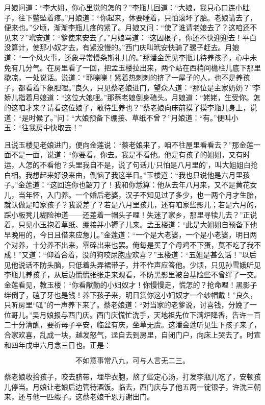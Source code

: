 月娘问道：“李大姐，你心里觉的怎的？”李瓶儿回道：“大娘，我只心口连小肚子，往下鳖坠着疼。”月娘道：“你起来，休要睡着，只怕滚坏了胎。老娘请去了，便来也。”少顷，渐渐李瓶儿疼的紧了。月娘又问：“使了谁请老娘去了？这咱还不见来？”玳安道：“爹使来安去了。”月娘骂道：“这囚根子，你还不快迎迎去！平白没算计，使那小奴才去，有紧没慢的。”西门庆叫玳安快骑了骡子赶去。月娘道：“一个风火事，还象寻常慢条斯礼儿的。”那潘金莲见李瓶儿待养孩子，心中未免有几分气。在房里看了一回，把孟玉楼拉出来，两个站在西梢间檐柱儿底下那里歇凉，一处说话。说道：“耶嚛嚛！紧着热剌剌的挤了一屋子的人，也不是养孩子，都看着下象胆哩。”良久，只见蔡老娘进门，望众人道：“那位是主家奶奶？”李娇儿指着月娘道：“这位大娘哩。”那蔡老娘倒身磕头。月娘道：“姥姥，生受你。怎的这咱才来？请看这位娘子，敢待生养也？”蔡老娘向床前摸了摸李瓶儿身上，说道：“是时候了。”问：“大娘预备下绷接、草纸不曾？”月娘道：“有。”便叫小玉：“往我房中快取去！”

且说玉楼见老娘进门，便向金莲说：“蔡老娘来了，咱不往屋里看看去？”那金莲一面不是一面，说道：“你要看，你去。我是不看他。他是有孩子的姐姐，又有时运，人怎的不看他？头里我自不是，说了句话儿‘只怕是八月里的’，叫大姐姐白抢白相。我想起来好没来由，倒恼了我这半日。”玉楼道：“我也只说他是六月里孩子。”金莲道：“这回连你也韶刀了！我和你恁算：他从去年八月来，又不是黄花女儿，当年怀，入门养。一个婚后老婆，汉子不知见过了多少，也一两个月才生胎，就认做是咱家孩子？我说差了？若是八月里孩儿，还有咱家些影儿；若是六月的，踩小板凳儿糊险神道——还差着一帽头子哩！失迷了家乡，那里寻犊儿去？”正说着，只见小玉抱着草纸、绷接并小褥子儿来。孟玉楼道：“此是大姐姐自预备下他早晚用的，今日且借来应急儿。”金莲道：“一个是大老婆，一个是小老婆，明日两个对养，十分养不出来，零碎出来也罢。俺每是买了个母鸡不下蛋，莫不吃了我不成！”又道：“仰着合着，没的狗咬尿胞虚欢喜？”玉楼道：“五姐是甚么话！”以后见他说话不防头脑，只低着头弄裙带子，并不作声应答他。少顷，只见孙雪娥听见李瓶儿养孩子，从后边慌慌张张走来观看，不防黑影里被台基险些不曾绊了一交。金莲看见，教玉楼：“你看献勤的小妇奴才！你慢慢走，慌怎的？抢命哩！黑影子绊倒了，磕了牙也是钱！养下孩子来，明日赏你这小妇奴才一个纱帽戴！”良久，只听房里“呱”的一声养下来了。蔡老娘道：“对当家的老爹说，讨喜钱，分娩了一位哥儿。”吴月娘报与西门庆。西门庆慌忙洗手，天地祖先位下满炉降香，告许一百二十分清醮，要祈母子平安，临盆有庆，坐草无虞。这潘金莲听见生下孩子来了，合家欢喜，乱成一块，越发怒气，迳自去到房里，自闭门户，向床上哭去了。时宣和四年戊申六月念三日也。正是：

\[
不如意事常八九，可与人言无二三。
\]

蔡老娘收拾孩子，咬去脐带，埋毕衣胞，熬了些定心汤，打发李瓶儿吃了，安顿孩儿停当。月娘让老娘后边管待酒饭。临去，西门庆与了他五两一锭银子，许洗三朝来，还与他一匹缎子。这蔡老娘千恩万谢出门。

